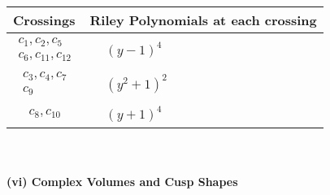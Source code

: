 \documentclass[1p]{elsarticle_modified}
\theoremstyle{definition}
\begin{document}
\begin{tabular}{m{50pt}|m{274pt}}
Crossings & \hspace{64pt}Riley Polynomials at each crossing \\
\hline $$\begin{aligned}c_{1},c_{2},c_{5}\\c_{6},c_{11},c_{12}\end{aligned}$$&$\begin{aligned}
&(y-1)^4
\end{aligned}$\\
\hline $$\begin{aligned}c_{3},c_{4},c_{7}\\c_{9}\end{aligned}$$&$\begin{aligned}
&(y^2+1)^2
\end{aligned}$\\
\hline $$\begin{aligned}c_{8},c_{10}\end{aligned}$$&$\begin{aligned}
&(y+1)^4
\end{aligned}$\\
\hline
\end{tabular}\\~\\
\newpage\flushleft \textbf{(vi) Complex Volumes and Cusp Shapes}
\end{document}
